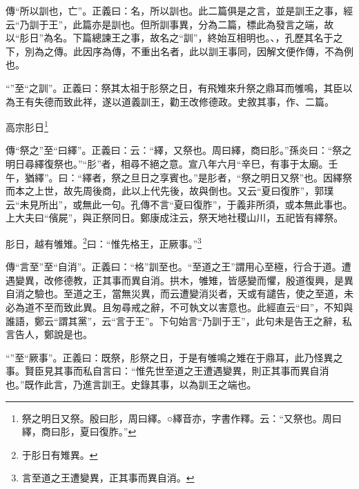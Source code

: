 {\noindent\zhuan{}\fzbyks 傳“所以訓也，亡”。正義曰：名，所以訓也。此二篇俱是之言，並是訓王之事，經云“乃訓于王”，此篇亦是訓也。但所訓事異，分為二篇，標此為發言之端，故以“肜日”為名。下篇總諫王之事，故名之“訓”，終始互相明也。、，孔歷其名于之下，別為之傳。此因序為傳，不重出名者，此以訓王事同，因解文便作傳，不為例也。 \par}

{\noindent\shu{}\fzkt “”至“之訓”。正義曰：祭其太祖于肜祭之日，有飛雉來升祭之鼎耳而雊鳴，其臣以為王有失德而致此祥，遂以道義訓王，勸王改修德政。史敘其事，作、二篇。 \par}

高宗肜日\footnote{祭之明日又祭。殷曰肜，周曰繹。○繹音亦，字書作釋。云：“又祭也。周曰繹，商曰肜，夏曰復胙。”}

{\noindent\zhuan{}\fzbyks 傳“祭之”至“曰繹”。正義曰：云：“繹，又祭也。周曰繹，商曰肜。”孫炎曰：“祭之明日尋繹復祭也。”“肜”者，相尋不絕之意。宣八年六月“辛巳，有事于太廟。壬午，猶繹”。曰：“繹者，祭之旦日之享賓也。”是肜者，“祭之明日又祭”也。因繹祭而本之上世，故先周後商，此以上代先後，故與倒也。又云“夏曰復胙”，郭璞云“未見所出”，或無此一句。孔傳不言“夏曰復胙”，于義非所須，或本無此事也。上大夫曰“儐屍”，與正祭同日。鄭康成注云，祭天地社稷山川，五祀皆有繹祭。 \par}

肜日，越有雊雉。\footnote{于肜日有雉異。}曰：“惟先格王，正厥事。”\footnote{言至道之王遭變異，正其事而異自消。}


{\noindent\zhuan{}\fzbyks 傳“言至”至“自消”。正義曰：“格”訓至也。“至道之王”謂用心至極，行合于道。遭遇變異，改修德教，正其事而異自消。拱木，雊雉，皆感變而懼，殷道復興，是異自消之驗也。至道之王，當無災異，而云遭變消災者，天或有譴告，使之至道，未必為道不至而致此異。且匆尋戒之辭，不可執文以害意也。此經直云“曰”，不知與誰語，鄭云“謂其黨”，云“言于王”。下句始言“乃訓于王”，此句未是告王之辭，私言告人，鄭說是也。 \par}

{\noindent\shu{}\fzkt “”至“厥事”。正義曰：既祭，肜祭之日，于是有雊鳴之雉在于鼎耳，此乃怪異之事。賢臣見其事而私自言曰：“惟先世至道之王遭遇變異，則正其事而異自消也。”既作此言，乃進言訓王。史錄其事，以為訓王之端也。 \par}

